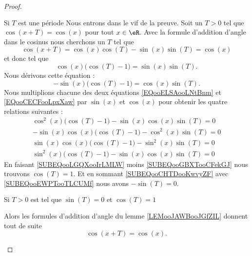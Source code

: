 \begin{proof}
\begin{subproof}
\item[Si \( T\) est une période]
    Nous entrons dans le vif de la preuve. Soit un \( T>0\) tel que \( \cos(x+T)=\cos(x)\) pour tout \( x\in \eR\). Avec la formule d'addition d'angle dans le cosinus nous cherchons un \( T\) tel que
    \begin{equation}
        \cos(x+T)=\cos(x)\cos(T)-\sin(x)\sin(T)=\cos(x)
    \end{equation}
    et donc tel que
    \begin{equation}        \label{EQooELSAooLNtBnm}
        \cos(x)\big( \cos(T)-1 \big)=\sin(x)\sin(T).
    \end{equation}
    Nous dérivons cette équation :
    \begin{equation}        \label{EQooCECFooLpxXaw}
        -\sin(x)\big( \cos(T)-1 \big)=\cos(x)\sin(T).
    \end{equation}
    Nous multiplions chacune des deux équations \eqref{EQooELSAooLNtBnm} et \eqref{EQooCECFooLpxXaw} par \( \sin(x)\) et \( \cos(x)\) pour obtenir les quatre relations suivantes :
    \begin{subequations}
        \begin{align}
            \cos^2(x)\big( \cos(T)-1 \big)-\sin(x)\cos(x)\sin(T)=0   \label{SUBEQooLGQXooIrLMLW}\\
            -\sin(x)\cos(x)\big( \cos(T)-1 \big)-\cos^2(x)\sin(T)=0     \label{SUBEQooCHTDooKwvyZF}\\
            \sin(x)\cos(x)\big( \cos(T)-1 \big)-\sin^2(x)\sin(T)=0 \label{SUBEQooEWPTooTLCUMf}\\
            \sin^2(x)\big( \cos(T)-1 \big)-\sin(x)\cos(x)\sin(T)=0  \label{SUBEQooGBXTooCFekGJ}
        \end{align}
    \end{subequations}
    En faisant \eqref{SUBEQooLGQXooIrLMLW} moins \eqref{SUBEQooGBXTooCFekGJ} nous trouvons \( \cos(T)=1\). Et en sommant \eqref{SUBEQooCHTDooKwvyZF} avec \eqref{SUBEQooEWPTooTLCUMf} nous avons \( -\sin(T)=0\).

\item[Si \( T>0\) est tel que \( \sin(T)=0\) et \( \cos(T)=1\)]

    Alors les formules d'addition d'angle du lemme \ref{LEMooJAWBooJGfZIL} donnent tout de suite
    \begin{equation}
        \cos(x+T)=\cos(x).
    \end{equation}

    \end{subproof}


\end{proof}
